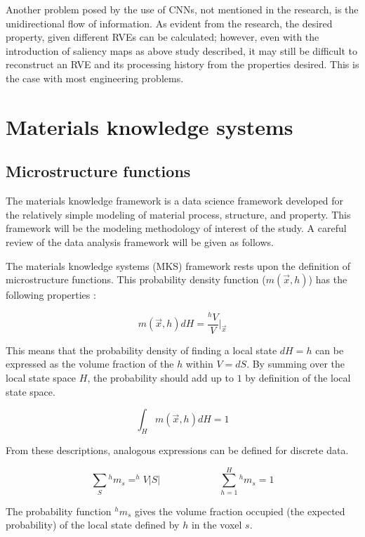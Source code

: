 Another problem posed by the use of CNNs, not mentioned in the research, is the unidirectional flow of information.
As evident from the research, the desired property, given different RVEs can be calculated; however, even with the introduction of saliency maps as above study described, it may still be difficult to reconstruct an RVE and its processing history from the properties desired.
This is the case with most engineering problems.


\section{Materials knowledge systems}

\subsection{Microstructure functions}

The materials knowledge framework is a data science framework developed for the relatively simple modeling of material process, structure, and property.
This framework will be the modeling methodology of interest of the study.
A careful review of the data analysis framework will be given as follows.

The materials knowledge systems (MKS) framework rests upon the definition of microstructure functions.
This probability density function ($m(\vec{x}, h)$) has the following properties \cite{delin}:

\[
  m(\vec{x}, h)dH = \dfrac{^{h}V}{V}\biggr\rvert_{\vec{x}}
\]

This means that the probability density of finding a local state $dH = h$ can be expressed as the volume fraction of the $h$ within $V = dS$.
By summing over the local state space $H$, the probability should add up to $1$ by definition of the local state space.

\[
  \int_H m(\vec{x}, h)dH = 1
\]

From these descriptions, analogous expressions can be defined for discrete data.

\[
  \sum_{S} {^hm_s} = ^hV\lvert S\rvert \hspace{1in}
  \sum_{h=1}^{H} {^hm_s} = 1
\]

The probability function $^hm_s$ gives the volume fraction occupied (the expected probability) of the local state defined by $h$ in the voxel $s$.

